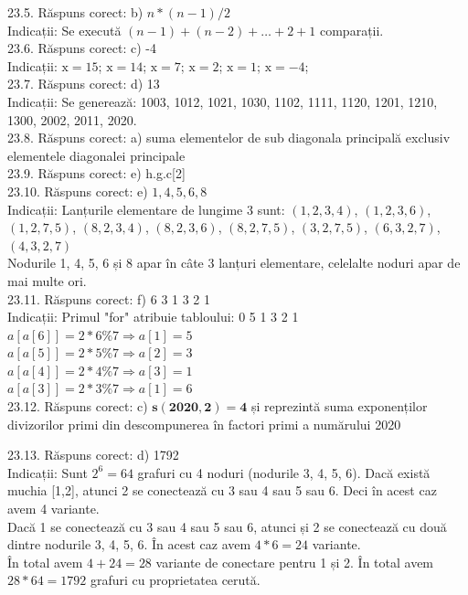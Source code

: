 23.5. Răspuns corect: b) $n *(n-1) / 2$\\
Indicații: Se execută $(n-1)+(n-2)+\ldots+2+1$ comparații.\\

23.6. Răspuns corect: c) -4\\
Indicații: $\mathrm{x}=15$; $\mathrm{x}=14$; $\mathrm{x}=7$; $\mathrm{x}=2$; $\mathrm{x}=1$; $\mathrm{x}=-4$;\\

23.7. Răspuns corect: d) 13\\
Indicații: Se generează: 1003, 1012, 1021, 1030, 1102, 1111, 1120, 1201, 1210, 1300, 2002, 2011, 2020.\\

23.8. Răspuns corect: a) suma elementelor de sub diagonala principală exclusiv elementele diagonalei principale\\

23.9. Răspuns corect: e) h.g.c[2]\\

23.10. Răspuns corect: e) $1,4,5,6,8$\\
Indicații: Lanțurile elementare de lungime 3 sunt: $(1,2,3,4)$, $(1,2,3,6)$, $(1,2,7,5)$, $(8,2,3,4)$, $(8,2,3,6)$, $(8,2,7,5)$, $(3,2,7,5)$, $(6,3,2,7)$, $(4,3,2,7)$\\ Nodurile 1, 4, 5, 6 și 8 apar în câte 3 lanțuri elementare, celelalte noduri apar de mai multe ori.\\

23.11. Răspuns corect: f) 6 3 1 3 2 1\\
Indicații: Primul "for" atribuie tabloului: 0 5 1 3 2 1\\ $a[a[6]]=2 * 6 \% 7 \Rightarrow a[1]=5$\\ $a[a[5]]=2 * 5 \% 7 \Rightarrow a[2]=3$\\ $a[a[4]]=2 * 4 \% 7 \Rightarrow a[3]=1$\\ $a[a[3]]=2 * 3 \% 7 \Rightarrow a[1]=6$\\

23.12. Răspuns corect: c) $\mathbf{s}(\mathbf{2 0 2 0}, \mathbf{2})=\mathbf{4}$ și reprezintă suma exponenților divizorilor primi din descompunerea în factori primi a numărului 2020

23.13. Răspuns corect: d) 1792\\
Indicații: Sunt $2^{6}=64$ grafuri cu 4 noduri (nodurile 3, 4, 5, 6). Dacă există muchia [1,2], atunci 2 se conectează cu 3 sau 4 sau 5 sau 6. Deci în acest caz avem 4 variante.\\ Dacă 1 se conectează cu 3 sau 4 sau 5 sau 6, atunci și 2 se conectează cu două dintre nodurile 3, 4, 5, 6. În acest caz avem $4 * 6=24$ variante.\\ În total avem $4+24=28$ variante de conectare pentru 1 și 2. În total avem $28*64=1792$ grafuri cu proprietatea cerută.\\

